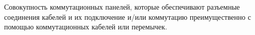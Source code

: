 Совокупность коммутационных панелей, которые обеспечивают
разъемные соединения кабелей и их подключение и/или
коммутацию преимущественно с помощью коммутационных
кабелей или перемычек.